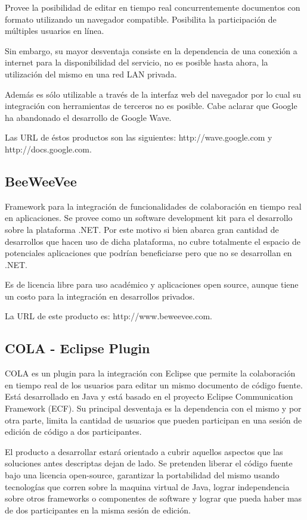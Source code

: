 \documentclass[12pt,a4paper]{article}
\begin{document}
	Provee la posibilidad de editar en tiempo real concurrentemente documentos con formato utilizando un navegador compatible. Posibilita la participación de múltiples usuarios en línea.

	Sin embargo, su mayor desventaja consiste en la dependencia de una conexión a internet para la disponibilidad del servicio, no es posible hasta ahora, la utilización del mismo en una red LAN privada.

	 Además es sólo utilizable a través de la interfaz web del navegador por lo cual su integración con herramientas de terceros no es posible. Cabe aclarar que Google ha abandonado el desarrollo de Google Wave.

	Las URL de éstos productos son las siguientes: http://wave.google.com y http://docs.google.com.

	\subsection{BeeWeeVee}

	Framework para la integración de funcionalidades de colaboración en tiempo real en aplicaciones. Se provee como un software development kit para el desarrollo sobre la plataforma .NET. Por este motivo si bien abarca gran cantidad de desarrollos que hacen uso de dicha plataforma, no cubre totalmente el espacio de potenciales aplicaciones que podrían beneficiarse pero que no se desarrollan en .NET. 

	Es de licencia libre para uso académico y aplicaciones open source, aunque tiene un costo para la integración en desarrollos privados.

	La URL de este producto es: http://www.beweevee.com.

	\subsection{COLA - Eclipse Plugin}

	COLA es un plugin para la integración con Eclipse que permite la colaboración en tiempo real de los usuarios para editar un mismo documento de código fuente. Está desarrollado en Java y está basado en el proyecto Eclipse Communication Framework (ECF). Su principal desventaja es la dependencia con el mismo y por otra parte, limita la cantidad de usuarios que pueden participan en una sesión de edición de código a dos participantes.

El producto a desarrollar estará orientado a cubrir aquellos aspectos que las soluciones antes descriptas dejan de lado. Se pretenden liberar el código fuente bajo una licencia open-source, garantizar la portabilidad del mismo usando tecnologías que corren sobre la maquina virtual de Java, lograr independencia sobre otros frameworks o componentes de software y lograr que pueda haber mas de dos participantes en la misma sesión de edición.
\end{document}
